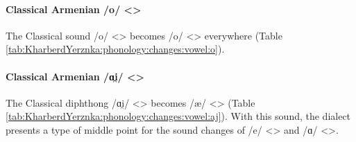 \paragraph{Classical Armenian /o/ <>}

The Classical sound /o/ <> becomes /o/ <> everywhere (Table \ref{tab:KharberdYerznka:phonology:changes:vowel:o}). 


\begin{table}[H]
	\centering 
	\caption{Change from Classical Armenian /o/ <> to /o/ <> in the Kharberd-Yerznka dialect}
	\label{tab:KharberdYerznka:phonology:changes:vowel:o}
\end{table}


\paragraph{Classical Armenian /ɑi̯/ <>}


The Classical diphthong /ɑi̯/ <> becomes /æ/ <> (Table \ref{tab:KharberdYerznka:phonology:changes:vowel:aj}). With this sound, the dialect presents a type of middle point for the sound changes of /e/ <> and /ɑ/ <>.

